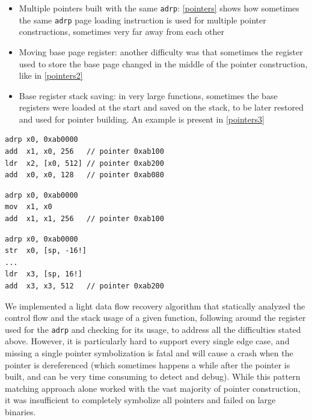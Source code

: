 \documentclass[a4paper,11pt,oneside]{report}
\begin{document}
\begin{itemize}
	\item Multiple pointers built with the same \texttt{adrp}:
		\autoref{pointers} shows how sometimes the same \texttt{adrp} page
		loading instruction is used for multiple pointer constructions,
		sometimes very far away from each other
	\item Moving base page register: another difficulty was that sometimes the 
		register used to store the base page changed in the middle of the 
		pointer construction, like in \autoref{pointers2}
	\item Base register stack saving: in very large functions, sometimes the 
		base registers were loaded at the start and saved on the stack, to be 
		later restored and used for pointer building. An example is present in 
		\autoref{pointers3}
\end{itemize}

\begin{lstlisting}[float,floatplacement=H,label=pointers,caption={Example of multiple pointers built from the same \texttt{adrp} instruction}]
adrp x0, 0xab0000
add  x1, x0, 256   // pointer 0xab100
ldr  x2, [x0, 512] // pointer 0xab200
add  x0, x0, 128   // pointer 0xab080
\end{lstlisting}
\begin{lstlisting}[float,floatplacement=H,label=pointers2,caption={Example of changing register during
pointer construction}]
adrp x0, 0xab0000
mov  x1, x0
add  x1, x1, 256   // pointer 0xab100
\end{lstlisting}
\begin{lstlisting}[float,floatplacement=H,label=pointers3,caption={Example of base page register stack
saving}]
adrp x0, 0xab0000
str  x0, [sp, -16!]
...
ldr  x3, [sp, 16!]
add  x3, x3, 512   // pointer 0xab200
\end{lstlisting}


We implemented a light data flow recovery algorithm
that statically analyzed the control flow and the stack usage of a given
function, following around the register used for the \texttt{adrp} and checking
for its usage, to address all the difficulties stated above. However, it is
particularly hard to support every single edge case, and missing a single
pointer symbolization is fatal and will cause a crash when the pointer is 
dereferenced (which sometimes happens a while after the pointer is built, 
and can be very time consuming to detect and debug). 
While this pattern matching approach alone worked with the vast majority of
pointer construction, it was insufficient to completely symbolize all pointers
and failed on large binaries. 
\end{document}
